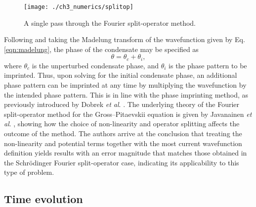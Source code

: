 \begin{figure}
    \centering
    \texttt{[image: ./ch3\_numerics/splitop]}
    \caption{A single pass through the Fourier split-operator method.}
    \label{fig:num_splitop}
\end{figure}

Following \cite{BK:Pitaevskii_Stringari_2003} and taking the Madelung transform of the wavefunction given by Eq. \eqref{eqn:madelung}, the phase of the condensate may be specified as
\begin{equation}
\theta = \theta_c + \theta_i,
\end{equation}
where $\theta_c$ is the unperturbed condensate phase, and $\theta_i$ is the phase pattern to be imprinted. Thus, upon solving for the initial condensate phase, an additional phase pattern can be imprinted at any time by multiplying the wavefunction by the intended phase pattern. This is in line with the phase imprinting method, as previously introduced by Dobrek \textit{et al}. \cite{Vtx:Dobrek_pra_1999}. The underlying theory of the Fourier split-operator method for the Gross--Pitaevskii equation is given by Javanainen \textit{et al}. \cite{BEC:Javanainen_jphysa_2006}, showing how the choice of non-linearity and operator splitting affects the outcome of the method. The authors arrive at the conclusion that treating the non-linearity and potential terms together with the most current wavefunction definition yields results with an error magnitude that matches those obtained in the Schr\"{o}dinger Fourier split-operator case, indicating its applicability to this type of problem.

 \subsection{Time evolution}

